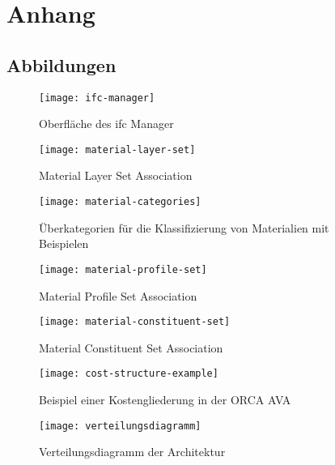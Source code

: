 \chapter{Anhang}
\label{a:append}
\section*{Abbildungen}

\begin{figure}[H]
	\centering
	\texttt{[image: ifc-manager]}
	\caption[IFC Manager]{Oberfläche des \ac{ifc} Manager}
	\label{fig:ifc-manager}
\end{figure}

\begin{figure}[H]
	\centering
	\texttt{[image: material-layer-set]}
	\caption[IfcMaterialLayerSet]{Material Layer Set Association}
	\label{fig:layer-set}
\end{figure}

\begin{sidewaysfigure}
	\centering
	\texttt{[image: material-categories]}
	\caption[MaterialCategories]{Überkategorien für die Klassifizierung von Materialien mit Beispielen}
	\label{fig:material-categories}
\end{sidewaysfigure}

\begin{figure}[H]
	\centering
	\texttt{[image: material-profile-set]}
	\caption[IfcMaterialProfileSet]{Material Profile Set Association}
	\label{fig:profile-set}
\end{figure}

\begin{figure}[H]
	\centering
	\texttt{[image: material-constituent-set]}
	\caption[IfcMaterialConsituentSet]{Material Constituent Set Association}
	\label{fig:constituent-set}
\end{figure}

\begin{figure}[H]
	\centering
	\texttt{[image: cost-structure-example]}
	\caption[CostStructure]{Beispiel einer Kostengliederung in der ORCA AVA}
	\label{fig:cost-structure}
\end{figure}

\begin{figure}[H]
	\centering
	\texttt{[image: verteilungsdiagramm]}
	\caption[Verteilungsdiagramm]{Verteilungsdiagramm der Architektur}
	\label{fig:distribution-diagramm}
\end{figure}

